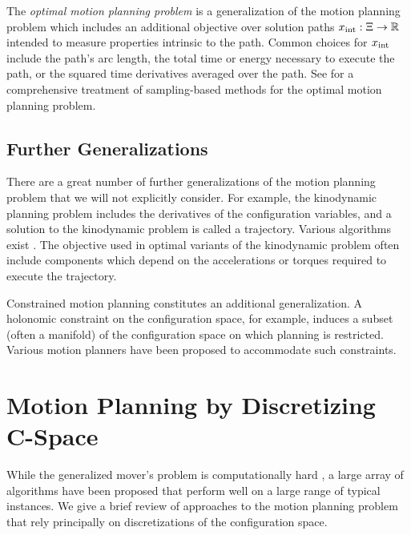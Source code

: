 The \emph{optimal motion planning problem}
is a generalization of the motion planning problem which
includes an additional objective over solution paths
$x_{\mbox{\scriptsize int}} : \Xi \rightarrow \mathbb{R}$
intended to measure properties intrinsic to the path.
Common choices for $x_{\mbox{\scriptsize int}}$ include
the path's arc length,
the total time or energy necessary to execute the path,
or the squared time derivatives averaged over the path.
See \citep{karaman2011samplingoptimal} for a comprehensive treatment
of sampling-based methods for the optimal motion planning problem.


\subsection{Further Generalizations}

There are a great number of further generalizations of the
motion planning problem that we will not explicitly consider.
For example,
the kinodynamic planning problem includes the derivatives of the
configuration variables,
and a solution to the kinodynamic problem is called a trajectory.
Various algorithms exist \citep{lavallekuffner1999rrt}.
The objective used in optimal variants of the kinodynamic problem
often include components which depend on the accelerations or torques
required to execute the trajectory.

Constrained motion planning constitutes an additional generalization.
A holonomic constraint on the configuration space,
for example,
induces a subset (often a manifold) of the configuration space
on which planning is restricted.
Various motion planners \citep{berenson2009manifolds}
have been proposed to accommodate such constraints.

\section{Motion Planning by Discretizing C-Space}

While the generalized mover's problem is computationally hard
\citep{reif1979moverscomplexity},
a large array of algorithms have been proposed that perform
well on a large range of typical instances.
We give a brief review of approaches to the motion planning problem
that rely principally on discretizations of the configuration space.

